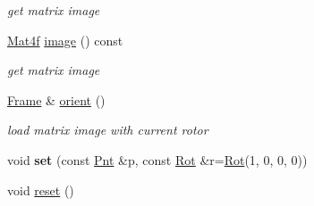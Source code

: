 \begin{DoxyCompactItemize}
\begin{DoxyCompactList}\small\item\em get matrix image \end{DoxyCompactList}\item 
\hypertarget{classvsr_1_1_frame_a9899b05c17a2ac1e61e9c54f72a2209a}{\hyperlink{classvsr_1_1_mat4}{Mat4f} \hyperlink{classvsr_1_1_frame_a9899b05c17a2ac1e61e9c54f72a2209a}{image} () const }\label{classvsr_1_1_frame_a9899b05c17a2ac1e61e9c54f72a2209a}

\begin{DoxyCompactList}\small\item\em get matrix image \end{DoxyCompactList}\item 
\hypertarget{classvsr_1_1_frame_a1c48969df0074df971ebf0e0817b5d17}{\hyperlink{classvsr_1_1_frame}{Frame} \& \hyperlink{classvsr_1_1_frame_a1c48969df0074df971ebf0e0817b5d17}{orient} ()}\label{classvsr_1_1_frame_a1c48969df0074df971ebf0e0817b5d17}

\begin{DoxyCompactList}\small\item\em load matrix image with current rotor \end{DoxyCompactList}\item 
\hypertarget{classvsr_1_1_frame_acb8514d5e2442429e62cc161fa35cda9}{void {\bfseries set} (const \hyperlink{namespacevsr_a2d05beb9721c5d9211b479af6d47222d}{Pnt} \&p, const \hyperlink{namespacevsr_aa1af5d33b552dd31499209a8f68548e8}{Rot} \&r=\hyperlink{namespacevsr_aa1af5d33b552dd31499209a8f68548e8}{Rot}(1, 0, 0, 0))}\label{classvsr_1_1_frame_acb8514d5e2442429e62cc161fa35cda9}

\item 
\hypertarget{classvsr_1_1_frame_a0369fca41d426fa18dcaf9f1de7fab41}{void \hyperlink{classvsr_1_1_frame_a0369fca41d426fa18dcaf9f1de7fab41}{reset} ()}\label{classvsr_1_1_frame_a0369fca41d426fa18dcaf9f1de7fab41}


\end{DoxyCompactItemize}
